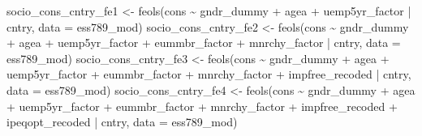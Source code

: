\documentclass[
]{article}
\newenvironment{Shaded}{\begin{snugshade}}{\end{snugshade}}
\newcommand{\AttributeTok}[1]{\textcolor[rgb]{0.77,0.63,0.00}{#1}}
\newcommand{\FunctionTok}[1]{\textcolor[rgb]{0.00,0.00,0.00}{#1}}
\newcommand{\NormalTok}[1]{#1}
\newcommand{\OtherTok}[1]{\textcolor[rgb]{0.56,0.35,0.01}{#1}}
\newcommand{\SpecialCharTok}[1]{\textcolor[rgb]{0.00,0.00,0.00}{#1}}
\begin{document}
\begin{Shaded}
\begin{Highlighting}[]
\NormalTok{socio\_cons\_cntry\_fe1 }\OtherTok{\textless{}{-}} \FunctionTok{feols}\NormalTok{(cons }\SpecialCharTok{\textasciitilde{}}\NormalTok{ gndr\_dummy }\SpecialCharTok{+}\NormalTok{ agea }\SpecialCharTok{+}\NormalTok{ uemp5yr\_factor }\SpecialCharTok{|}\NormalTok{ cntry, }\AttributeTok{data =}\NormalTok{ ess789\_mod)}
\NormalTok{socio\_cons\_cntry\_fe2 }\OtherTok{\textless{}{-}} \FunctionTok{feols}\NormalTok{(cons }\SpecialCharTok{\textasciitilde{}}\NormalTok{ gndr\_dummy }\SpecialCharTok{+}\NormalTok{ agea }\SpecialCharTok{+}\NormalTok{ uemp5yr\_factor }\SpecialCharTok{+} 
\NormalTok{                              eummbr\_factor }\SpecialCharTok{+}\NormalTok{ mnrchy\_factor }\SpecialCharTok{|}\NormalTok{ cntry, }\AttributeTok{data =}\NormalTok{ ess789\_mod)}
\NormalTok{socio\_cons\_cntry\_fe3 }\OtherTok{\textless{}{-}} \FunctionTok{feols}\NormalTok{(cons }\SpecialCharTok{\textasciitilde{}}\NormalTok{ gndr\_dummy }\SpecialCharTok{+}\NormalTok{ agea }\SpecialCharTok{+}\NormalTok{ uemp5yr\_factor }\SpecialCharTok{+} 
\NormalTok{                              eummbr\_factor }\SpecialCharTok{+}\NormalTok{ mnrchy\_factor }\SpecialCharTok{+}\NormalTok{ impfree\_recoded }\SpecialCharTok{|}\NormalTok{ cntry, }\AttributeTok{data =}\NormalTok{ ess789\_mod)}
\NormalTok{socio\_cons\_cntry\_fe4 }\OtherTok{\textless{}{-}} \FunctionTok{feols}\NormalTok{(cons }\SpecialCharTok{\textasciitilde{}}\NormalTok{ gndr\_dummy }\SpecialCharTok{+}\NormalTok{ agea }\SpecialCharTok{+}\NormalTok{ uemp5yr\_factor }\SpecialCharTok{+} 
\NormalTok{                              eummbr\_factor }\SpecialCharTok{+}\NormalTok{ mnrchy\_factor }\SpecialCharTok{+}\NormalTok{ impfree\_recoded }\SpecialCharTok{+}\NormalTok{ ipeqopt\_recoded }\SpecialCharTok{|}\NormalTok{ cntry, }\AttributeTok{data =}\NormalTok{ ess789\_mod)}


\end{Highlighting}
\end{Shaded}
\end{document}
